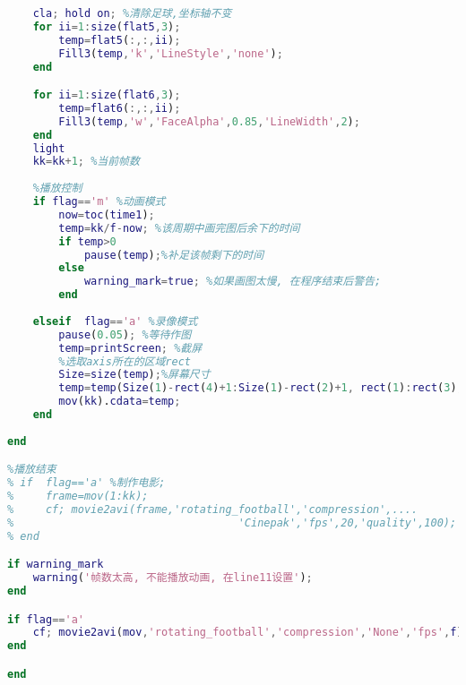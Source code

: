 \begin{lstlisting}[language=matlab, caption=draw\_football.m]
    %画图
    cla; hold on; %清除足球,坐标轴不变
    for ii=1:size(flat5,3);
        temp=flat5(:,:,ii);
        Fill3(temp,'k','LineStyle','none');
    end

    for ii=1:size(flat6,3);
        temp=flat6(:,:,ii);
        Fill3(temp,'w','FaceAlpha',0.85,'LineWidth',2);
    end
    light
    kk=kk+1; %当前帧数
    
    %播放控制
    if flag=='m' %动画模式
        now=toc(time1);
        temp=kk/f-now; %该周期中画完图后余下的时间
        if temp>0
            pause(temp);%补足该帧剩下的时间
        else
            warning_mark=true; %如果画图太慢, 在程序结束后警告;    
        end
        
    elseif  flag=='a' %录像模式
        pause(0.05); %等待作图
        temp=printScreen; %截屏
        %选取axis所在的区域rect
        Size=size(temp);%屏幕尺寸
        temp=temp(Size(1)-rect(4)+1:Size(1)-rect(2)+1, rect(1):rect(3),:);
        mov(kk).cdata=temp;
    end
    
end

%播放结束
% if  flag=='a' %制作电影;
%     frame=mov(1:kk);
%     cf; movie2avi(frame,'rotating_football','compression',....
%                                   'Cinepak','fps',20,'quality',100); 
% end

if warning_mark
    warning('帧数太高, 不能播放动画, 在line11设置');
end

if flag=='a'
    cf; movie2avi(mov,'rotating_football','compression','None','fps',f);
end

end
\end{lstlisting}
